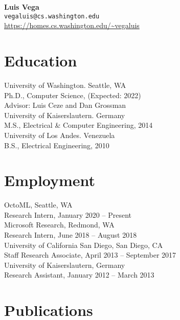 \documentclass[10pt]{article}
\begin{document}
{\LARGE \textbf{Luis Vega}} \\
\texttt{vegaluis@cs.washington.edu} \\
\url{https://homes.cs.washington.edu/~vegaluis}

\section*{Education}

University of Washington. Seattle, WA \\
Ph.D., Computer Science, (Expected: 2022) \\
Advisor: Luis Ceze and Dan Grossman \\

University of Kaiserslautern. Germany \\
M.S., Electrical \& Computer Engineering, 2014 \\

University of Los Andes. Venezuela \\
B.S., Electrical Engineering, 2010 \\

\section*{Employment}

OctoML, Seattle, WA \\
Research Intern, January 2020 -- Present \\

Microsoft Research, Redmond, WA \\
Research Intern, June 2018 -- August 2018 \\

University of California San Diego, San Diego, CA \\
Staff Research Associate, April 2013 -- September 2017 \\

University of Kaiserslautern, Germany \\
Research Assistant, January 2012 -- March 2013 \\

\section*{Publications}
\end{document}
